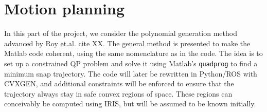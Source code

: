 \documentclass{article}
\begin{document}
\section{Motion planning}\label{sec:reftraj}
In this part of the project, we consider the polynomial generation method advanced by Roy et.al. cite XX. The general method is presented to make the Matlab code coherent, using the same nomenclature as in the code. The idea is to set up a constrained QP problem and solve it using Matlab's \texttt{quadprog} to find a minimum snap trajectory. The code will later be rewritten in Python/ROS with CVXGEN, and additional constraints will be enforced to ensure that the trajectory always stay in safe convex regions of space. These regions can conceivably be computed using IRIS, but will be assumed to be known initially.
\end{document}
